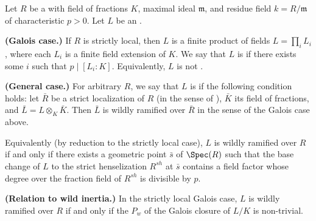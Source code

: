 \begin{definition} \label{definition:wildly_ramified_etale_algebra_over_a_dvr}
Let $R$ be a  with field of fractions $K$, maximal ideal $\mathfrak{m}$, and residue field $k = R/\mathfrak{m}$ of characteristic $p > 0$. Let $L$ be an .

\textbf{(Galois case.)} If $R$ is strictly local, then $L$ is a finite product of fields $L = \prod_i L_i$, where each $L_i$ is a finite field extension of $K$. We say that $L$ is  if there exists some $i$ such that $p \mid [L_i : K]$. Equivalently, $L$ is not .

\textbf{(General case.)} For arbitrary $R$, we say that $L$ is  if the following condition holds: let $\bar{R}$ be a strict localization of $R$ (in the sense of ), $\bar{K}$ its field of fractions, and $\bar{L} = L \otimes_K \bar{K}$. Then $\bar{L}$ is wildly ramified over $\bar{R}$ in the sense of the Galois case above.

Equivalently (by reduction to the strictly local case), $L$ is wildly ramified over $R$ if and only if there exists a geometric point $\bar{s}$ of $\Spec(R)$ such that the base change of $L$ to the strict henselization $R^{sh}$ at $\bar{s}$ contains a field factor whose degree over the fraction field of $R^{sh}$ is divisible by $p$.

\textbf{(Relation to wild inertia.)} In the strictly local Galois case, $L$ is wildly ramified over $R$ if and only if the  $P_w$ of the Galois closure of $L/K$ is non-trivial.
\end{definition}
